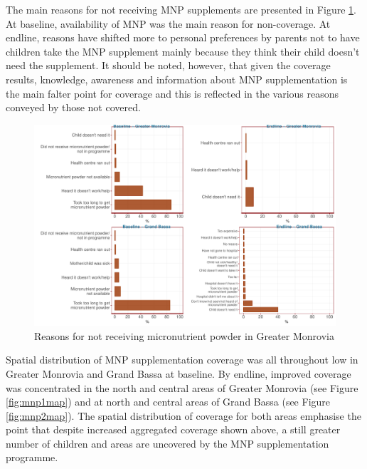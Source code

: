 \documentclass[12pt,a4paper]{article}
\begin{document}
The main reasons for not receiving MNP supplements are presented in Figure \ref{fig:mnp2plot}. At baseline, availability of MNP was the main reason for non-coverage. At endline, reasons have shifted more to personal preferences by parents not to have children take the MNP supplement mainly because they think their child doesn't need the supplement. It should be noted, however, that given the coverage results, knowledge, awareness and information about MNP supplementation is the main falter point for coverage and this is reflected in the various reasons conveyed by those not covered.

\begin{figure}[H]

{\centering \includegraphics{liberiaCoverageFinalReport_files/figure-latex/mnp2plot-1} 

}

\caption{Reasons for not receiving micronutrient powder in Greater Monrovia}\label{fig:mnp2plot}
\end{figure}

Spatial distribution of MNP supplementation coverage was all throughout low in Greater Monrovia and Grand Bassa at baseline. By endline, improved coverage was concentrated in the north and central areas of Greater Monrovia (see Figure \ref{fig:mnp1map}) and at north and central areas of Grand Bassa (see Figure \ref{fig:mnp2map}). The spatial distribution of coverage for both areas emphasise the point that despite increased aggregated coverage shown above, a still greater number of children and areas are uncovered by the MNP supplementation programme.
\end{document}
